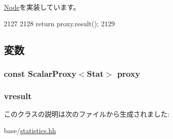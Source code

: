 \hyperlink{classStats_1_1Node_ab152b7e89b37a7db03b04d500ceb8349}{Node}を実装しています。


\begin{DoxyCode}
2127     {
2128         return proxy.result();
2129     }
\end{DoxyCode}


\subsection{変数}
\hypertarget{classStats_1_1ScalarProxyNode_a99c66bf770906ef1ea3ca0f9a02d87df}{
\subsubsection[{proxy}]{\setlength{\rightskip}{0pt plus 5cm}const {\bf ScalarProxy}$<$Stat$>$ {\bf proxy}}}
\label{classStats_1_1ScalarProxyNode_a99c66bf770906ef1ea3ca0f9a02d87df}
\hypertarget{classStats_1_1ScalarProxyNode_a8f41af856442757ec68f3391333d3eb2}{
\subsubsection[{vresult}]{ {\bf vresult}}}
\label{classStats_1_1ScalarProxyNode_a8f41af856442757ec68f3391333d3eb2}


このクラスの説明は次のファイルから生成されました:\begin{DoxyCompactItemize}
\item 
base/\hyperlink{statistics_8hh}{statistics.hh}\end{DoxyCompactItemize}

